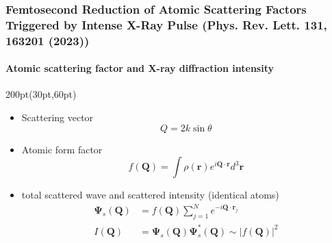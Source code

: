 \begin{frame}
\frametitle{Femtosecond Reduction of Atomic Scattering Factors Triggered by 
Intense X-Ray Pulse \small (Phys. Rev. Lett. \textbf{131}, 163201 (2023))}
\framesubtitle{Atomic scattering factor and X-ray diffraction intensity}


\footnotesize
 
\begin{textblock*}{200pt}(30pt,60pt)
\begin{itemize}
\footnotesize
\item Scattering vector
\begin{equation}
Q = 2k\sin\theta
\end{equation}
\item Atomic form factor
\begin{equation}
f(\boldsymbol{Q}) = \int \rho(\boldsymbol{r})
  e^{i\boldsymbol{Q}\cdot\boldsymbol{r}} d^3\boldsymbol{r}
\end{equation}

\item total scattered wave and scattered intensity (identical atoms)
\begin{align}
\boldsymbol{\Psi}_s(\boldsymbol{Q}) & = f(\boldsymbol{Q})\sum_{j=1}^N 
   e^{-i\boldsymbol{Q}\cdot\boldsymbol{r}_j} \\
I(\boldsymbol{Q}) 
& = \boldsymbol{\Psi}_s(\boldsymbol{Q})\boldsymbol{\Psi}_s^{*}(\boldsymbol{Q}) 
\sim \left| f(\boldsymbol{Q})\right|^2
\end{align}


\end{itemize}
\end{textblock*}



\end{frame}







